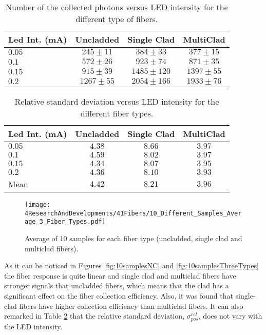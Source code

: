 \begin{table}[h]
\centering{}%
\begin{tabular}{lccc}
\toprule 
Led Int. (mA) & Uncladded & Single Clad & MultiClad \tabularnewline
\midrule
\midrule 
$0.05$ & $245 \pm 11$ & $384 \pm 33$ & $377 \pm 15$ \tabularnewline
$0.1$ & $572 \pm 26$ & $923 \pm 74$ & $871 \pm 35$ \tabularnewline
$0.15$ & $915 \pm 39$ & $1485 \pm 120$ & $1397 \pm 55$ \tabularnewline
$0.2$ & $1267 \pm 55$ & $2054 \pm 166$ & $1933 \pm 76$ \tabularnewline
\bottomrule
\end{tabular}
\caption{Number of the collected photons versus LED intensity for the different type of fibers.}
\label{tab:10DifferentSamples}
\end{table}

\begin{table}[h]
\centering{}%
\begin{tabular}{lccc}
\toprule 
Led Int. (mA) & Uncladded & Single Clad & MultiClad \tabularnewline
\midrule
\midrule 
$0.05$ & $4.38$ & $8.66$ & $3.97$ \tabularnewline
$0.1$ & $4.59$ & $8.02$ & $3.97$ \tabularnewline
$0.15$ & $4.34$ & $8.07$ & $3.95$ \tabularnewline
$0.2$ & $4.36$ & $8.10$ & $3.93$ \tabularnewline
Mean & $4.42$ & $8.21$ & $3.96$ \tabularnewline
\bottomrule
\end{tabular}
\caption{Relative standard deviation versus LED intensity for the different fiber types.}
\label{tab:RelativeStandardDeviation3FiberTypes}
\end{table}

\begin{figure}[h]
\centering
\texttt{[image: 4ResearchAndDevelopments/41Fibers/10\_Different\_Samples\_Average\_3\_Fiber\_Types.pdf]}
\caption{Average of 10 samples for each fiber type (uncladded, single clad and multiclad fibers).\label{fig:AveregeThreeFiberTypes}}
\end{figure}

As it can be noticed in Figures \ref{fig:10samplesNC} and \ref{fig:10samplesThreeTypes} the fiber response is quite linear and single clad and multiclad fibers have stronger signals that uncladded fibers, which means that the clad has a significant effect on the fiber collection efficiency. Also, it was found that single-clad fibers have higher collection efficiency than multiclad fibers. It can also remarked in Table \ref{tab:RelativeStandardDeviation3FiberTypes} that the relative standard deviation, $\sigma^{rel}_{pos}$, does not vary with the LED intensity.



